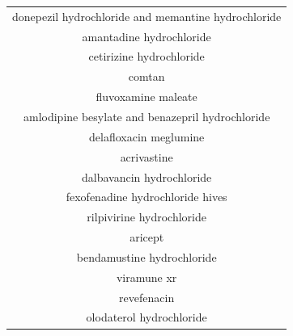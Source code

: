 \documentclass{article}
\begin{document}
\begin{table}[t!]
\begin{tabular}[t]{c}
donepezil hydrochloride and memantine hydrochloride \\
amantadine hydrochloride \\
cetirizine hydrochloride \\
comtan \\
fluvoxamine maleate \\
amlodipine besylate and benazepril hydrochloride \\
delafloxacin meglumine \\
acrivastine \\
dalbavancin hydrochloride \\
fexofenadine hydrochloride hives \\
rilpivirine hydrochloride \\
aricept \\
bendamustine hydrochloride \\
viramune xr \\
revefenacin \\
olodaterol hydrochloride \\
\hline
\end{tabular}
\end{table}
\end{document}
